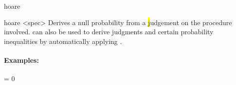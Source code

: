 \begin{tactic}{hoare}
  \begin{tsyntax}{hoare <spec>}
  Derives a null probability from a \hl judgement on the procedure
  involved.  can also be used to derive \phl judgments and
  certain probability inequalities by automatically applying
  .

  \paragraph{Examples:}\strut

  \begin{cmathpar}
    \texample
      {}
      {}
      { = 0}

    \texample
      {}
      {}
      {}
  \end{cmathpar}
  \end{tsyntax}
\end{tactic}
